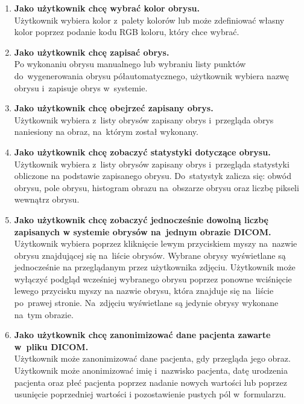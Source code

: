 \documentclass[a4paper,11pt,twoside,openright]{report}
\theoremstyle{definition}
\begin{document}
\begin{enumerate}
\item \textbf {Jako użytkownik chcę wybrać kolor obrysu.} \\
Użytkownik wybiera kolor z~palety kolorów lub może zdefiniować własny kolor poprzez
podanie kodu RGB koloru, który chce wybrać.

\item \textbf {Jako użytkownik chcę zapisać obrys.} \\
Po wykonaniu obrysu manualnego lub wybraniu listy punktów do~wygenerowania obrysu
półautomatycznego, użytkownik wybiera nazwę obrysu i~zapisuje obrys w~systemie.

\item \textbf {Jako użytkownik chcę obejrzeć zapisany obrys.} \\
Użytkownik wybiera z~listy obrysów zapisany obrys i~przegląda obrys naniesiony
na obraz, na~którym został wykonany.

\item \textbf {Jako użytkownik chcę zobaczyć statystyki dotyczące obrysu.} \\
Użytkownik wybiera z~listy obrysów zapisany obrys i~przegląda statystyki obliczone
na podstawie zapisanego obrysu. Do~statystyk zalicza się: obwód obrysu, pole obrysu,
histogram obrazu na~obszarze obrysu oraz liczbę pikseli wewnątrz obrysu.

\item \textbf {Jako użytkownik chcę zobaczyć jednocześnie dowolną liczbę zapisanych
w systemie obrysów na~jednym obrazie DICOM.} \\
Użytkownik wybiera poprzez kliknięcie lewym przyciskiem myszy na~nazwie obrysu
znajdującej się na~liście obrysów. Wybrane obrysy wyświetlane są jednocześnie
na przeglądanym przez użytkownika zdjęciu. Użytkownik może wyłączyć podgląd
wcześniej wybranego obrysu poprzez ponowne wciśnięcie lewego przycisku myszy
na nazwie obrysu, która znajduje się na~liście po~prawej stronie. Na~zdjęciu wyświetlane są jedynie
obrysy wykonane na~tym obrazie.

\item \textbf {Jako użytkownik chcę zanonimizować dane pacjenta zawarte w~pliku DICOM.} \\
Użytkownik może zanonimizować dane pacjenta, gdy przegląda jego obraz. Użytkownik może
anonimizować imię i~nazwisko pacjenta, datę urodzenia pacjenta oraz płeć pacjenta
poprzez nadanie nowych wartości lub poprzez usunięcie poprzedniej wartości i
pozostawienie pustych pól w~formularzu.

\end{enumerate}
\end{document}
